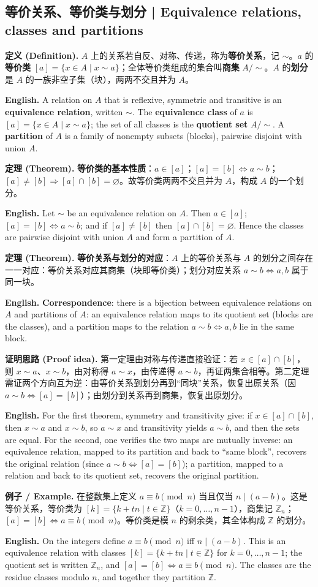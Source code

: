 \documentclass[UTF8,11pt,a4paper]{ctexart}
\newcommand{\EN}[1]{\par\noindent \textbf{English.} #1\par}
\newcommand{\EX}[2]{\par\noindent \textbf{例子 / Example.} #1\par\EN{#2}}
\newcommand{\DEF}[2]{\par\noindent\textbf{定义 (Definition).} #1\par\EN{#2}}
\newcommand{\THM}[2]{\par\noindent\textbf{定理 (Theorem).} #1\par\EN{#2}}
\newcommand{\PRF}[2]{\par\noindent\textbf{证明思路 (Proof idea).} #1\par\EN{#2}}
\begin{document}
\subsection{等价关系、等价类与划分 | Equivalence relations, classes and partitions}
\DEF{$A$ 上的关系若自反、对称、传递，称为\textbf{等价关系}，记 $\sim$。$a$ 的\textbf{等价类} $[a]=\{x\in A\mid x\sim a\}$；全体等价类组成的集合叫\textbf{商集} $A/{\sim}$。$A$ 的\textbf{划分}是 $A$ 的一族非空子集（块），两两不交且并为 $A$。}{A relation on $A$ that is reflexive, symmetric and transitive is an \textbf{equivalence relation}, written $\sim$. The \textbf{equivalence class} of $a$ is $[a]=\{x\in A\mid x\sim a\}$; the set of all classes is the \textbf{quotient set} $A/{\sim}$. A \textbf{partition} of $A$ is a family of nonempty subsets (blocks), pairwise disjoint with union $A$.}
\THM{\textbf{等价类的基本性质}：$a\in[a]$；$[a]=[b]\Leftrightarrow a\sim b$；$[a]\ne[b]\Rightarrow[a]\cap[b]=\varnothing$。故等价类两两不交且并为 $A$，构成 $A$ 的一个划分。}{Let $\sim$ be an equivalence relation on $A$. Then $a\in[a]$; $[a]=[b]\Leftrightarrow a\sim b$; and if $[a]\ne[b]$ then $[a]\cap[b]=\varnothing$. Hence the classes are pairwise disjoint with union $A$ and form a partition of $A$.}
\THM{\textbf{等价关系与划分的对应}：$A$ 上的等价关系与 $A$ 的划分之间存在一一对应：等价关系对应其商集（块即等价类）；划分对应关系 $a\sim b\Leftrightarrow a,b$ 属于同一块。}{\textbf{Correspondence}: there is a bijection between equivalence relations on $A$ and partitions of $A$: an equivalence relation maps to its quotient set (blocks are the classes), and a partition maps to the relation $a\sim b\Leftrightarrow a,b$ lie in the same block.}
\PRF{第一定理由对称与传递直接验证：若 $x\in[a]\cap[b]$，则 $x\sim a$、$x\sim b$，由对称得 $a\sim x$，由传递得 $a\sim b$，再证两集合相等。第二定理需证两个方向互为逆：由等价关系到划分再到“同块”关系，恢复出原关系（因 $a\sim b\Leftrightarrow[a]=[b]$）；由划分到关系再到商集，恢复出原划分。}{For the first theorem, symmetry and transitivity give: if $x\in[a]\cap[b]$, then $x\sim a$ and $x\sim b$, so $a\sim x$ and transitivity yields $a\sim b$, and then the sets are equal. For the second, one verifies the two maps are mutually inverse: an equivalence relation, mapped to its partition and back to ``same block'', recovers the original relation (since $a\sim b\Leftrightarrow[a]=[b]$); a partition, mapped to a relation and back to its quotient set, recovers the original partition.}

\EX{在整数集上定义 $a\equiv b\pmod n$ 当且仅当 $n\mid(a-b)$。这是等价关系，等价类为 $[k]=\{k+tn\mid t\in\mathbb Z\}$（$k=0,\dots,n-1$），商集记 $\mathbb Z_n$；$[a]=[b]\Leftrightarrow a\equiv b\pmod n$。等价类是模 $n$ 的剩余类，其全体构成 $\mathbb Z$ 的划分。}{On the integers define $a\equiv b\pmod n$ iff $n\mid(a-b)$. This is an equivalence relation with classes $[k]=\{k+tn\mid t\in\mathbb Z\}$ for $k=0,\dots,n-1$; the quotient set is written $\mathbb Z_n$, and $[a]=[b]\Leftrightarrow a\equiv b\pmod n$. The classes are the residue classes modulo $n$, and together they partition $\mathbb Z$.}
\end{document}
